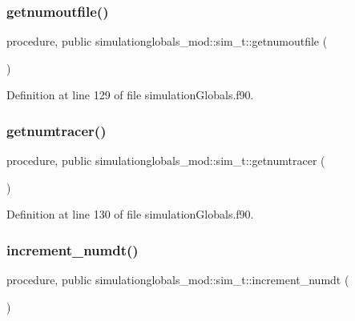 \subsubsection{\texorpdfstring{getnumoutfile()}{getnumoutfile()}}
{\footnotesize\ttfamily procedure, public simulationglobals\+\_\+mod\+::sim\+\_\+t\+::getnumoutfile (\begin{DoxyParamCaption}{ }\end{DoxyParamCaption})}



Definition at line 129 of file simulation\+Globals.\+f90.

\mbox{\label{structsimulationglobals__mod_1_1sim__t_af581a3f3854589b767c95bf4b3d3a388}} 
\subsubsection{\texorpdfstring{getnumtracer()}{getnumtracer()}}
{\footnotesize\ttfamily procedure, public simulationglobals\+\_\+mod\+::sim\+\_\+t\+::getnumtracer (\begin{DoxyParamCaption}{ }\end{DoxyParamCaption})}



Definition at line 130 of file simulation\+Globals.\+f90.

\mbox{\label{structsimulationglobals__mod_1_1sim__t_ade3d2bcc84ed41592b0712a0355be108}} 
\subsubsection{\texorpdfstring{increment\+\_\+numdt()}{increment\_numdt()}}
{\footnotesize\ttfamily procedure, public simulationglobals\+\_\+mod\+::sim\+\_\+t\+::increment\+\_\+numdt (\begin{DoxyParamCaption}{ }\end{DoxyParamCaption})}



